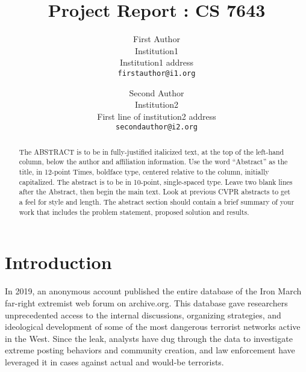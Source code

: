 \documentclass[10pt,twocolumn,letterpaper]{article}
\begin{document}
\title{Project Report : CS 7643}

\author{First Author\\
Institution1\\
Institution1 address\\
{\tt\small firstauthor@i1.org}
\and
Second Author\\
Institution2\\
First line of institution2 address\\
{\tt\small secondauthor@i2.org}
}

\maketitle

\begin{abstract}
   The ABSTRACT is to be in fully-justified italicized text, at the top
   of the left-hand column, below the author and affiliation
   information. Use the word ``Abstract'' as the title, in 12-point
   Times, boldface type, centered relative to the column, initially
   capitalized. The abstract is to be in 10-point, single-spaced type.
   Leave two blank lines after the Abstract, then begin the main text.
   Look at previous CVPR abstracts to get a feel for style and length. 
   The abstract section should contain a brief summary of your work that
   includes the problem statement, proposed solution and results.
\end{abstract}

\section{Introduction}

In 2019, an anonymous account published the entire database of the Iron March far-right extremist web forum on archive.org. This database gave researchers unprecedented access to the internal discussions, organizing strategies, and ideological  development of some of the most dangerous terrorist networks active in the West. Since the leak, analysts have dug through the data to investigate extreme posting behaviors and community creation, and law enforcement have leveraged it in cases against actual and would-be terrorists. 
\end{document}
